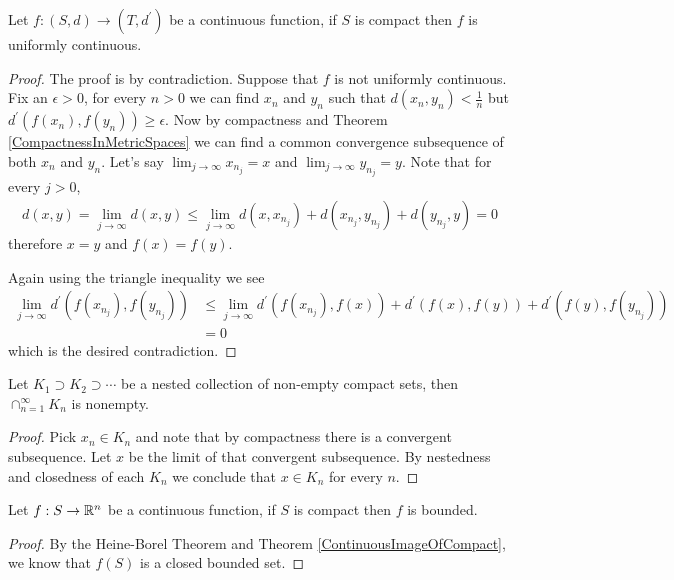 \begin{thm}\label{UniformContinuityOnCompactSets} Let $f : (S,d) \to (T, d^\prime)$ be a continuous function, if $S$ is
  compact then $f$ is uniformly continuous.
\end{thm}
\begin{proof}
The proof is by contradiction.  Suppose that $f$ is not uniformly
continuous.  Fix an $\epsilon > 0$, for every $n > 0$ we can find
$x_n$ and $y_n$ such that $d(x_n, y_n) < \frac{1}{n}$ but
$d^\prime(f(x_n), f(y_n)) \geq \epsilon$.  Now by compactness and Theorem
\ref{CompactnessInMetricSpaces} we can find a
common convergence subsequence of both $x_n$ and $y_n$.  Let's say
$\lim_{j \to \infty} x_{n_j} = x$ and $\lim_{j \to \infty} y_{n_j} =
y$.  Note that for every $j>0$, 
\begin{align*}
d(x,y) = \lim_{j \to \infty } d(x,y)\leq \lim_{j \to \infty } d(x,
x_{n_j}) + d(x_{n_j}, y_{n_j}) + d(y_{n_j}, y) = 0
\end{align*}
therefore $x=y$ and $f(x)=f(y)$.  

Again using the triangle inequality we see
\begin{align*}
\lim_{j \to \infty} d^\prime(f(x_{n_j}), f(y_{n_j})) &\leq \lim_{j \to \infty}
d^\prime(f(x_{n_j}), f(x)) + d^\prime(f(x), f(y)) + d^\prime(f(y), f(y_{n_j}))  \\
&= 0
\end{align*}
which is the desired contradiction.
\end{proof}

\begin{lem}\label{IntersectionOfNestedCompactSets}Let $K_1 \supset K_2
  \supset \cdots$ be a nested collection of non-empty compact sets,
  then $\cap_{n=1}^\infty K_n$ is nonempty.
\end{lem}
\begin{proof}Pick $x_n \in K_n$ and note that by compactness there is
  a convergent subsequence.  Let $x$ be the limit of that convergent
  subsequence.  By nestedness and closedness of each $K_n$ we conclude
  that $x \in K_n$ for every $n$.
\end{proof}

\begin{thm}Let $f : S \to \mathbb{R}^n$ be a continuous function, if $S$ is
  compact then $f$ is bounded.
\end{thm}
\begin{proof}
By the Heine-Borel Theorem and Theorem \ref{ContinuousImageOfCompact}, we know that $f(S)$ is a closed bounded set.
\end{proof}

